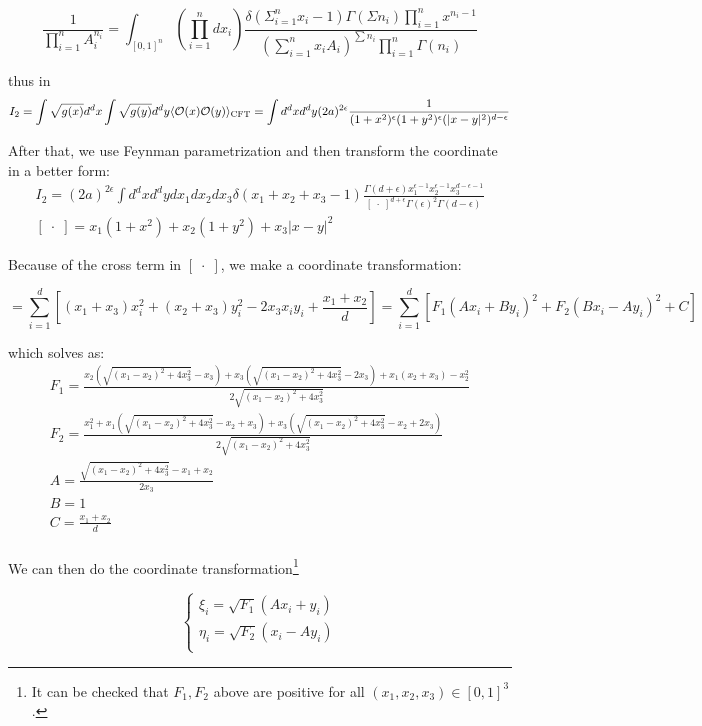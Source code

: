 \documentclass[12pt, a4paper]{article}
\numberwithin{equation}{section}
\newcommand{\be}{\begin{equation}}
\newcommand{\ee}{\end{equation}}
\newcommand{\cO}{\mathcal{O}}
\begin{document}
\be
\frac{1}{\prod_{i=1}^{n}A_i^{n_i}} = \int_{[0,1]^n}\left(\prod_{i=1}^{n}dx_i\right)\frac{\delta\left(\Sigma_{i=1}^{n}x_i-1\right)\Gamma(\Sigma n_i)\prod_{i=1}^{n}x^{n_i-1}}{\left(\sum_{i=1}^{n}x_iA_i\right)^{\sum n_i}\prod_{i=1}^n\Gamma(n_i)}
\ee

	thus in \cite{Klebanov:2011fs}
\be
	I_2 = \int \sqrt{g(x)}d^dx\int\sqrt{g(y)}d^dy \langle \cO(x)\cO(y)\rangle_{\rm CFT} = \int d^dxd^dy(2a)^{2\epsilon}\frac{1}{(1+x^2)^\epsilon (1+y^2)^\epsilon (|x-y|^2)^{d-\epsilon}}
\ee

	After that, we use Feynman parametrization and then transform the coordinate in a better form:
\be
\begin{aligned}
	I_2 = (2a)^{2\epsilon}\int d^dxd^dydx_1dx_2dx_3 \delta(x_1+x_2+x_3-1)\frac{\Gamma(d+\epsilon)x_1^{\epsilon-1}x_2^{\epsilon-1}x_3^{d-\epsilon-1}}{ [\;\cdot\;]^{d+\epsilon}\Gamma(\epsilon)^2\Gamma(d-\epsilon)}\\
	 [\;\cdot\;] = x_1(1+x^2) +x_2(1+y^2) + x_3|x-y|^2
\end{aligned}
\ee

	Because of the cross term in $[\;\cdot\;]$, we make a coordinate transformation:

\be
[\;\cdot\;] = \sum_{i=1}^{d}\left[(x_1+x_3)x_i^2 + (x_2+x_3)y_i^2 - 2x_3x_iy_i+\frac{x_1+x_2}{d}\right] = \sum_{i=1}^d [F_1(Ax_i+By_i)^2 + F_2(Bx_i - Ay_i)^2 + C]
\ee
	
	which solves as:
\be
\begin{aligned}
	&F_1 = \frac{x_2 \left(\sqrt{(x_1-x_2)^2+4x_3^2}-x_3\right)+x_3\left(\sqrt{(x_1-x_2)^2+4 x_3^2}-2x_3\right)+x_1 (x_2+x_3)-x_2^2}{2\sqrt{(x_1-x_2)^2+4 x_3^2}}&\\
	&F_2 = \frac{x_1^2+x_1 \left(\sqrt{(x_1-x_2)^2+4x_3^2}-x_2+x_3\right)+x_3
		\left(\sqrt{(x_1-x_2)^2+4 x_3^2}-x_2+2x_3\right)}{2 \sqrt{(x_1-x_2)^2+4x_3^2}}&\\
	&A = \frac{\sqrt{(x_1-x_2)^2+4x_3^2}-x_1+x_2}{2 x_3}&\\
&	B = 1&\\
	&C = \frac{x_1+x_2}{d}&\\
\end{aligned}
\ee

	We can then do the coordinate transformation\footnote{It can be checked that $F_1, F_2$ above are positive for all $(x_1, x_2, x_3)\in [0,1]^3$.}

\be
\left\{
\begin{aligned}
	\xi_i = \sqrt{F_1}(Ax_i+y_i)\\
	\eta_i = \sqrt{F_2}(x_i - Ay_i)\\
\end{aligned}
\right.
\ee
\end{document}
